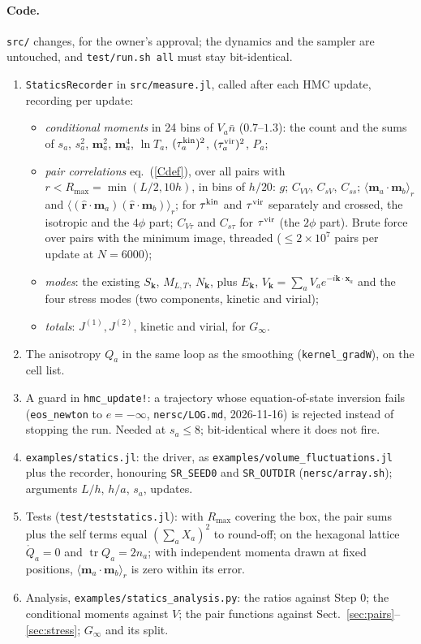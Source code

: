\documentclass[11pt,aps,preprint,nofootinbib,superscriptaddress,tightenlines]{revtex4-2}
\newcommand{\avg}[1]{\langle #1\rangle}
\def\Eq#1{eq.~(\ref{#1})}
\def\Sect#1{Sect.~\ref{#1}}
\def\tr{\operatorname{tr}}
\let\oldparagraph\paragraph
\renewcommand{\paragraph}{\par\bigskip\oldparagraph}
\begin{document}
\paragraph{Code.}  \texttt{src/} changes, for the owner's approval; the dynamics and the sampler are untouched, and \texttt{test/run.sh all} must stay
bit-identical.
\begin{enumerate}
\item \texttt{StaticsRecorder} in \texttt{src/measure.jl}, called after each HMC update, recording per update:
  \begin{itemize}
  \item \emph{conditional moments} in 24 bins of $V_a\bar n$ ($0.7$--$1.3$): the count and the sums of $s_a$, $s_a^2$, $\bm m_a^2$, $\bm m_a^4$, $\ln T_a$,
    $(\tau_a^{\rm kin})^2$, $(\tau^{\rm vir}_a)^2$, $P_a$;
  \item \emph{pair correlations} \Eq{Cdef}, over all pairs with $r<R_{\max}=\min(L/2,10h)$, in bins of $h/20$: $g$; $C_{VV}$, $C_{sV}$, $C_{ss}$; $\avg{\bm m_a\cdot\bm m_b}_r$ and
    $\avg{(\hat{\bm r}\cdot\bm m_a)(\hat{\bm r}\cdot\bm m_b)}_r$; for $\tau^{\rm kin}$ and $\tau^{\rm vir}$ separately and crossed, the isotropic and the $4\phi$ part; $C_{V\tau}$
    and $C_{s\tau}$ for $\tau^{\rm vir}$ (the $2\phi$ part).  Brute force over pairs with the minimum image, threaded ($\le2\times10^7$ pairs per update at $N=6000$);
  \item \emph{modes}: the existing $S_{\bm k}$, $M_{L,T}$, $N_{\bm k}$, plus $E_{\bm k}$, $V_{\bm k}=\sum_aV_ae^{-i\bm k\cdot\bm x_a}$ and the four stress modes (two components, kinetic
    and virial);
  \item \emph{totals}: $J^{(1)},J^{(2)}$, kinetic and virial, for $G_\infty$.
  \end{itemize}
\item The anisotropy $Q_a$ in the same loop as the smoothing (\texttt{kernel\_gradW}), on the cell list.
\item A guard in \texttt{hmc\_update!}: a trajectory whose equation-of-state inversion fails (\texttt{eos\_newton} to $e=-\infty$, \texttt{nersc/LOG.md}, 2026-11-16)
  is rejected instead of stopping the run.  Needed at $s_a\le8$; bit-identical where it does not fire.
\item \texttt{examples/statics.jl}: the driver, as \texttt{examples/volume\_fluctuations.jl} plus the recorder, honouring \texttt{SR\_SEED0} and \texttt{SR\_OUTDIR}
  (\texttt{nersc/array.sh}); arguments $L/h$, $h/a$, $s_a$, updates.
\item Tests (\texttt{test/teststatics.jl}): with $R_{\max}$ covering the box, the pair sums plus the self terms equal $(\sum_aX_a)^2$ to round-off; on the hexagonal
  lattice $\mathring Q_a=0$ and $\tr Q_a=2n_a$; with independent momenta drawn at fixed positions, $\avg{\bm m_a\cdot\bm m_b}_r$ is zero within its error.
\item Analysis, \texttt{examples/statics\_analysis.py}: the ratios against Step 0; the conditional moments against $V$; the pair functions against
  \Sect{sec:pairs}--\ref{sec:stress}; $G_\infty$ and its split.
\end{enumerate}
\end{document}
